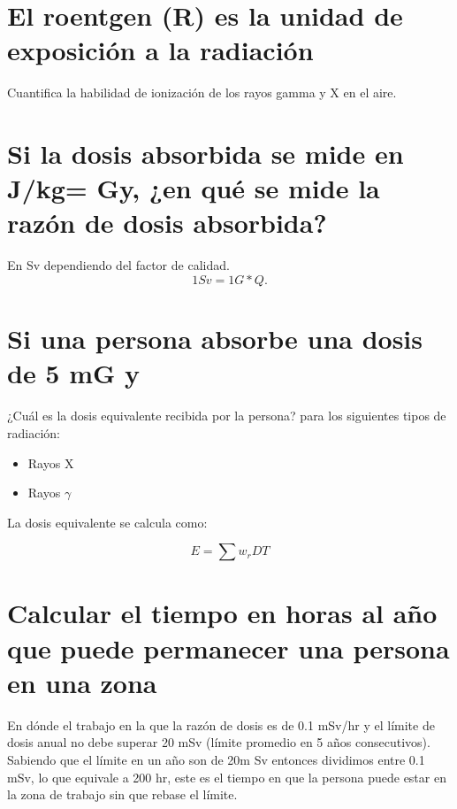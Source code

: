 \documentclass[]{article}
\begin{document}
 \section{El roentgen (R) es la unidad de exposición a la radiación}

Cuantifica la
habilidad de ionización de los rayos gamma y X en el aire.\\

\section{Si la dosis absorbida se mide en J/kg= Gy, ¿en qué se mide la razón de dosis absorbida?}
En Sv dependiendo del factor de calidad.\\ 

\begin{equation}
1Sv=1G*Q. 
\end{equation}

\section{Si una persona absorbe una dosis de 5 mG y}

¿Cuál es la dosis equivalente recibida por
la persona? para los siguientes tipos de radiación:\\

\begin{itemize}
	\item Rayos X
	\item Rayos $\gamma$
\end{itemize}


La dosis equivalente se calcula como:

\begin{equation}
E=\sum w_r D T
\end{equation}

\section{Calcular el tiempo en horas al año que puede permanecer una persona en una zona}

	En dónde el trabajo en la que la razón de dosis es de 0.1 mSv/hr y el límite de dosis anual no debe
superar 20 mSv (límite promedio en 5 años consecutivos).\\

Sabiendo que el límite en un año son de 20m Sv entonces dividimos entre 0.1 mSv, lo que
equivale a 200 hr, este es el tiempo en que la persona puede estar en la zona de trabajo sin que
rebase el límite.\\
\end{document}
